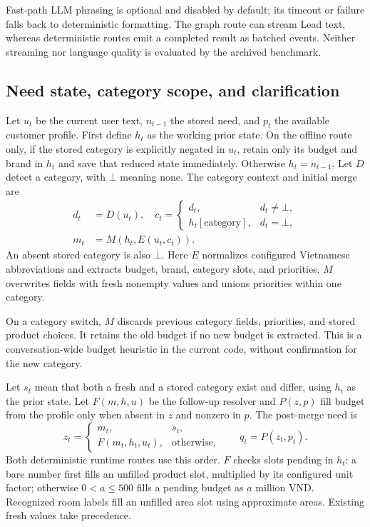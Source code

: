 \documentclass[conference,a4paper]{IEEEtran}
\begin{document}
Fast-path LLM phrasing is optional and disabled by default; its timeout or failure falls back to deterministic formatting. The graph route can stream Lead text, whereas deterministic routes emit a completed result as batched events. Neither streaming nor language quality is evaluated by the archived benchmark.

\subsection{Need state, category scope, and clarification}
Let $u_t$ be the current user text, $n_{t-1}$ the stored need, and $p_t$ the available customer profile. First define $h_t$ as the working prior state. On the offline route only, if the stored category is explicitly negated in $u_t$, retain only its budget and brand in $h_t$ and save that reduced state immediately. Otherwise $h_t=n_{t-1}$. Let $D$ detect a category, with $\bot$ meaning none. The category context and initial merge are
\begin{align}
d_t&=D(u_t),\quad c_t=\begin{cases}d_t,&d_t\ne\bot,\\h_t[\mathrm{category}],&d_t=\bot,\end{cases}\label{eq:context}\\
m_t&=M\!\left(h_t,E(u_t,c_t)\right).\label{eq:state}
\end{align}
An absent stored category is also $\bot$. Here $E$ normalizes configured Vietnamese abbreviations and extracts budget, brand, category slots, and priorities. $M$ overwrites fields with fresh nonempty values and unions priorities within one category.

On a category switch, $M$ discards previous category fields, priorities, and stored product choices. It retains the old budget if no new budget is extracted. This is a conversation-wide budget heuristic in the current code, without confirmation for the new category.

Let $s_t$ mean that both a fresh and a stored category exist and differ, using $h_t$ as the prior state. Let $F(m,h,u)$ be the follow-up resolver and $P(z,p)$ fill budget from the profile only when absent in $z$ and nonzero in $p$. The post-merge need is
\[
z_t=\begin{cases}m_t,&s_t,\\F(m_t,h_t,u_t),&\text{otherwise},\end{cases}
\qquad q_t=P(z_t,p_t).
\]
Both deterministic runtime routes use this order. $F$ checks slots pending in $h_t$: a bare number first fills an unfilled product slot, multiplied by its configured unit factor; otherwise $0<a\le500$ fills a pending budget as $a$ million VND. Recognized room labels fill an unfilled area slot using approximate areas. Existing fresh values take precedence.
\end{document}
